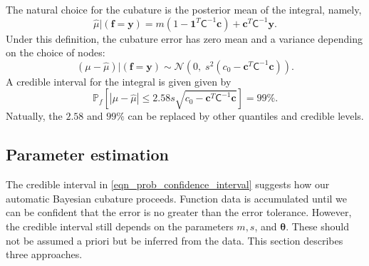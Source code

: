 \documentclass[twocolumn]{svjour3}          %
\newcommand{\bm}[1]{\boldsymbol{#1}}
\newcommand{\vtheta}{{\bm{\theta}}}
\newcommand{\vc}{\bm{c}}
\newcommand{\vf}{\bm{f}}
\newcommand{\vy}{\bm{y}}
\newcommand{\vone}{\bm{1}}
\newcommand{\mC}{\mathsf{C}}
\newcommand{\calN}{\mathcal{N}}
\newcommand{\hmu}{\widehat{\mu}}
\begin{document}
The natural choice for  the cubature is the posterior mean of the integral, namely, 
\begin{equation}
\label{eqn:BayesCub}
\widehat{\mu}  \vert ( \vf = \vy)
= m(1 - \vone^T  \mC^{-1}\vc )
+ \vc^T \mC^{-1} \vy.
\end{equation}
Under this definition, the cubature error has zero mean and a variance depending on the choice of nodes:
\begin{equation*}
(\mu-\hmu) | (\vf = \vy)
 \sim  \calN 
\left(
0, \;
s^2 (c_0 - \vc^T\mC^{-1}\vc) 
\right).
\end{equation*}
A credible interval for the integral is given given by 
\begin{equation}
\label{eqn_prob_confidence_interval}
\mathbb{P}_f \left[
|\mu-\hmu| \leq  2.58 s \sqrt{c_0 - \vc^T\mC^{-1}\vc } 
\right] = 99\%.
\end{equation}
Natually, the $2.58$ and $99\%$ can be replaced by other quantiles and credible levels.


\subsection{Parameter estimation}
The credible interval in \eqref{eqn_prob_confidence_interval} suggests how our automatic Bayesian cubature proceeds.  Function data is accumulated until we can be confident that the error is no greater than the error tolerance.  However, the credible interval still depends on the parameters $m, s$, and $\vtheta$.  These should not be assumed a priori but be inferred from the data.  This section describes three approaches.
\end{document}
